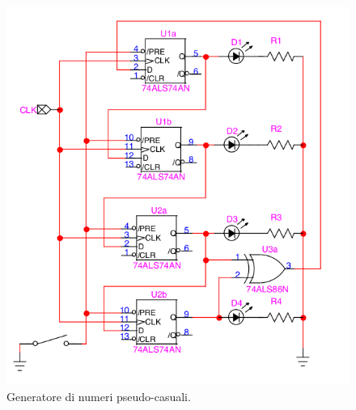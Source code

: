 \documentclass[10pt,a4paper]{article}
\begin{document}
\begin{figure}
\centering
\includegraphics[scale=0.5]{pseudi.png}
\caption{Generatore di numeri pseudo-casuali.\label{pseudo}}
\end{figure}
\end{document}
